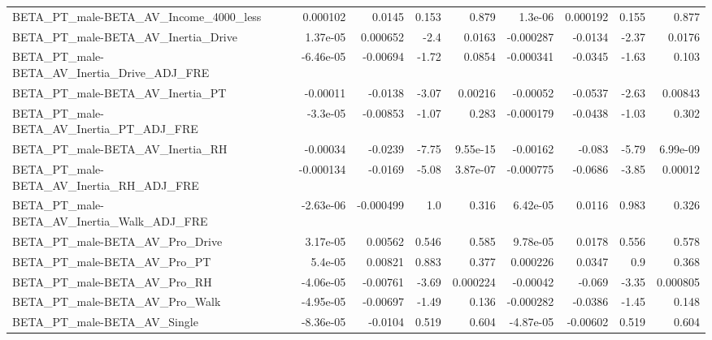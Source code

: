 \begin{tabular}{lrrrrrrrr}
BETA\_PT\_male-BETA\_AV\_Income\_4000\_less              &    0.000102 &       0.0145 &    0.153 &    0.879 &    1.3e-06 &    0.000192 &        0.155 &         0.877 \\
BETA\_PT\_male-BETA\_AV\_Inertia\_Drive                 &    1.37e-05 &     0.000652 &     -2.4 &   0.0163 &  -0.000287 &     -0.0134 &        -2.37 &        0.0176 \\
BETA\_PT\_male-BETA\_AV\_Inertia\_Drive\_ADJ\_FRE         &   -6.46e-05 &     -0.00694 &    -1.72 &   0.0854 &  -0.000341 &     -0.0345 &        -1.63 &         0.103 \\
BETA\_PT\_male-BETA\_AV\_Inertia\_PT                    &    -0.00011 &      -0.0138 &    -3.07 &  0.00216 &   -0.00052 &     -0.0537 &        -2.63 &       0.00843 \\
BETA\_PT\_male-BETA\_AV\_Inertia\_PT\_ADJ\_FRE            &    -3.3e-05 &     -0.00853 &    -1.07 &    0.283 &  -0.000179 &     -0.0438 &        -1.03 &         0.302 \\
BETA\_PT\_male-BETA\_AV\_Inertia\_RH                    &    -0.00034 &      -0.0239 &    -7.75 & 9.55e-15 &   -0.00162 &      -0.083 &        -5.79 &      6.99e-09 \\
BETA\_PT\_male-BETA\_AV\_Inertia\_RH\_ADJ\_FRE            &   -0.000134 &      -0.0169 &    -5.08 & 3.87e-07 &  -0.000775 &     -0.0686 &        -3.85 &       0.00012 \\
BETA\_PT\_male-BETA\_AV\_Inertia\_Walk\_ADJ\_FRE          &   -2.63e-06 &    -0.000499 &      1.0 &    0.316 &   6.42e-05 &      0.0116 &        0.983 &         0.326 \\
BETA\_PT\_male-BETA\_AV\_Pro\_Drive                     &    3.17e-05 &      0.00562 &    0.546 &    0.585 &   9.78e-05 &      0.0178 &        0.556 &         0.578 \\
BETA\_PT\_male-BETA\_AV\_Pro\_PT                        &     5.4e-05 &      0.00821 &    0.883 &    0.377 &   0.000226 &      0.0347 &          0.9 &         0.368 \\
BETA\_PT\_male-BETA\_AV\_Pro\_RH                        &   -4.06e-05 &     -0.00761 &    -3.69 & 0.000224 &   -0.00042 &      -0.069 &        -3.35 &      0.000805 \\
BETA\_PT\_male-BETA\_AV\_Pro\_Walk                      &   -4.95e-05 &     -0.00697 &    -1.49 &    0.136 &  -0.000282 &     -0.0386 &        -1.45 &         0.148 \\
BETA\_PT\_male-BETA\_AV\_Single                        &   -8.36e-05 &      -0.0104 &    0.519 &    0.604 &  -4.87e-05 &    -0.00602 &        0.519 &         0.604 \\

\end{tabular}

